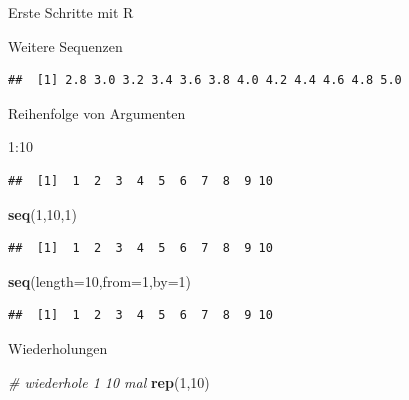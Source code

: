 \documentclass[ignorenonframetext,]{beamer}
\newenvironment{Shaded}{}{}
\newcommand{\KeywordTok}[1]{\textcolor[rgb]{0.00,0.44,0.13}{\textbf{{#1}}}}
\newcommand{\DataTypeTok}[1]{\textcolor[rgb]{0.56,0.13,0.00}{{#1}}}
\newcommand{\DecValTok}[1]{\textcolor[rgb]{0.25,0.63,0.44}{{#1}}}
\newcommand{\CommentTok}[1]{\textcolor[rgb]{0.38,0.63,0.69}{\textit{{#1}}}}
\newcommand{\NormalTok}[1]{{#1}}
\begin{document}
\begin{frame}[fragile]{Erste Schritte mit R}
\begin{block}{Weitere Sequenzen}
\begin{verbatim}
##  [1] 2.8 3.0 3.2 3.4 3.6 3.8 4.0 4.2 4.4 4.6 4.8 5.0
\end{verbatim}

\end{block}

\begin{block}{Reihenfolge von Argumenten}

\begin{Shaded}
\begin{Highlighting}[]
\DecValTok{1}\NormalTok{:}\DecValTok{10}
\end{Highlighting}
\end{Shaded}

\begin{verbatim}
##  [1]  1  2  3  4  5  6  7  8  9 10
\end{verbatim}

\begin{Shaded}
\begin{Highlighting}[]
\KeywordTok{seq}\NormalTok{(}\DecValTok{1}\NormalTok{,}\DecValTok{10}\NormalTok{,}\DecValTok{1}\NormalTok{)}
\end{Highlighting}
\end{Shaded}

\begin{verbatim}
##  [1]  1  2  3  4  5  6  7  8  9 10
\end{verbatim}

\begin{Shaded}
\begin{Highlighting}[]
\KeywordTok{seq}\NormalTok{(}\DataTypeTok{length=}\DecValTok{10}\NormalTok{,}\DataTypeTok{from=}\DecValTok{1}\NormalTok{,}\DataTypeTok{by=}\DecValTok{1}\NormalTok{)}
\end{Highlighting}
\end{Shaded}

\begin{verbatim}
##  [1]  1  2  3  4  5  6  7  8  9 10
\end{verbatim}

\end{block}

\begin{block}{Wiederholungen}

\begin{Shaded}
\begin{Highlighting}[]
\CommentTok{# wiederhole 1 10 mal}
\KeywordTok{rep}\NormalTok{(}\DecValTok{1}\NormalTok{,}\DecValTok{10}\NormalTok{)}
\end{Highlighting}
\end{Shaded}


\end{block}
\end{frame}
\end{document}
